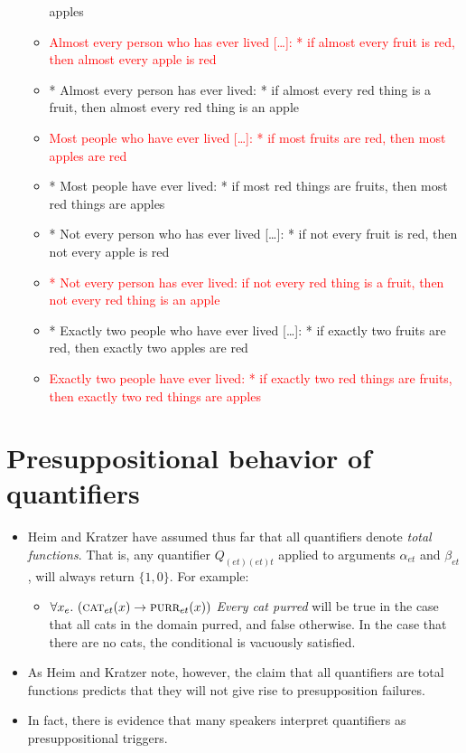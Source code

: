 \documentclass[a4paper]{article}
\begin{document}
\begin{itemize}
\begin{itemize}
    apples
  \item \textcolor{red}{Almost every person who has ever lived [\ldots]: * if almost every fruit is red, then
      almost every apple is red}
  \item * Almost every person has ever lived: * if almost every red thing is a fruit, then almost
    every red thing is an apple
  \item \textcolor{red}{Most people who have ever lived [\ldots]: * if most fruits are red, then most apples are red}
  \item * Most people have ever lived: * if most red things are fruits, then most red things are
    apples
  \item * Not every person who has ever lived [\ldots]: * if not every fruit is red, then not every apple is red
  \item \textcolor{red}{* Not every person has ever lived: if not every red thing is a fruit, then not every
      red thing is an apple}
  \item * Exactly two people who have ever lived [\ldots]: * if exactly two fruits are red, then exactly two
    apples are red
  \item \textcolor{red}{Exactly two people have ever lived: * if exactly two red things are fruits, then exactly two red
    things are apples}
  \end{itemize}
\end{itemize}




\section{Presuppositional behavior of quantifiers}
\begin{itemize}
    \item Heim and Kratzer have assumed thus far that all quantifiers denote \emph{total functions}. That is, any quantifier $Q_{(et)(et)t}$ applied to arguments $\alpha_{et}$ and $\beta_{et}$, will always return $\lbrace1, 0\rbrace$. For example:
    \begin{itemize}
      \item $\forall x_e.\ (\textsc{cat}_{et}(x) -> \textsc{purr}_{et}(x))$ \emph{Every cat purred} will be true in the case that all cats in the domain purred, and false otherwise. In the case that there are no cats, the conditional is vacuously satisfied.
    \end{itemize}
    \item As Heim and Kratzer note, however, the claim that all quantifiers are total functions predicts that they will not give rise to presupposition failures.
    \item In fact, there is evidence that many speakers interpret quantifiers as presuppositional triggers.
\end{itemize}
\end{document}
